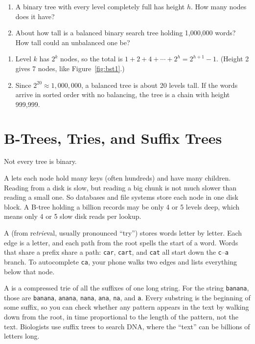 \begin{Exercise}[title={How Tall?}, label={ex:tree_height}]
\begin{enumerate}
\item A binary tree with every level completely full has height $h$. How many nodes does it have?
\item About how tall is a balanced binary search tree holding 1,000,000 words? How tall could an unbalanced one be?
\end{enumerate}
\end{Exercise}
\begin{Answer}[ref={ex:tree_height}]
\begin{enumerate}
\item Level $k$ has $2^k$ nodes, so the total is $1 + 2 + 4 + \cdots + 2^h = 2^{h+1} - 1$. (Height 2 gives 7 nodes, like Figure~\ref{fig:bst1}.)
\item Since $2^{20} \approx 1{,}000{,}000$, a balanced tree is about 20 levels tall. If the words arrive in sorted order with no balancing, the tree is a chain with height 999,999.
\end{enumerate}
\end{Answer}

\section{B-Trees, Tries, and Suffix Trees}

Not every tree is binary.

A  lets each node hold many keys (often
hundreds) and have many children. Reading from a disk is slow, but reading
a big chunk is not much slower than reading a small one. So databases and
file systems store each node in one disk block. A B-tree holding a billion
records may be only 4 or 5 levels deep, which means only 4 or 5 slow disk
reads per lookup.

A  (from re\emph{trie}val, usually pronounced
``try'') stores words letter by letter. Each edge is a letter, and each
path from the root spells the start of a word. Words that share a prefix
share a path: \texttt{car}, \texttt{cart}, and \texttt{cat} all start down
the \texttt{c}--\texttt{a} branch. To autocomplete \texttt{ca}, your phone
walks two edges and lists everything below that node.

A  is a compressed trie of all the
suffixes of one long string. For the string \texttt{banana}, those are
\texttt{banana}, \texttt{anana}, \texttt{nana}, \texttt{ana}, \texttt{na},
and \texttt{a}. Every substring is the beginning of some suffix, so you can
check whether any pattern appears in the text by walking down from the
root, in time proportional to the length of the pattern, not the text.
Biologists use suffix trees to search DNA, where the ``text'' can be
billions of letters long.

